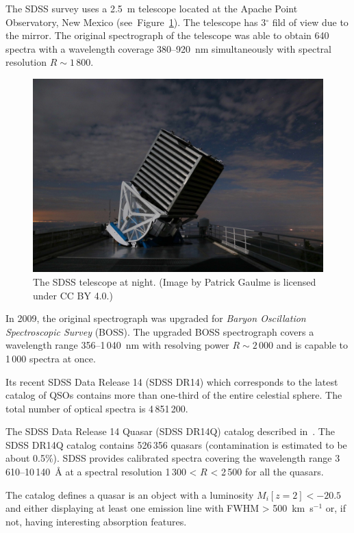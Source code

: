 The SDSS survey uses a 2.5~m telescope located at the Apache Point Observatory, New Mexico (see~Figure~\ref{sdss_telescope}).
The telescope has 3\(^{\circ}\) fild of view due to the mirror.
The original spectrograph of the telescope was able to obtain 640 spectra
with a wavelength coverage 380--920~nm simultaneously
with spectral resolution \(R \sim 1\,800\).~\cite{gunn1998, york2000}

\begin{figure}
\includegraphics[width=\textwidth]{img/sdss_gaulme.jpg}
\caption[The SDSS telescope]{
	The SDSS telescope at night.
	(Image by Patrick Gaulme is licensed under CC BY 4.0.)
	}
\label{sdss_telescope}
\end{figure}

In 2009, the original spectrograph was upgraded for \textit{Baryon Oscillation Spectroscopic Survey} (BOSS).
The upgraded BOSS spectrograph covers a wavelength range 356--1\,040~nm
with resolving power \(R \sim 2\,000\)
and is capable to 1\,000 spectra at once.~\cite{smee2013}

Its recent SDSS Data Release 14 (SDSS DR14) which corresponds to the latest catalog of QSOs
contains more than one-third of the entire celestial sphere.
The total number of optical spectra is 4\,851\,200.

The SDSS Data Release 14 Quasar (SDSS DR14Q) catalog described in~\cite{paris2018}.
The SDSS DR14Q catalog contains 526\,356 quasars (contamination is estimated to be about 0.5\%).
SDSS provides calibrated spectra covering the wavelength range 3\,610--10\,140~\AA{} at a spectral resolution 1\,300 < \(R\) < 2\,500 for all the quasars.

The catalog defines a quasar is an object with a luminosity \(M_i[z = 2] < -20.5\)
and either displaying at least one emission line with FWHM > 500~km~s\(^{-1}\) or,
if not, having interesting absorption features.

